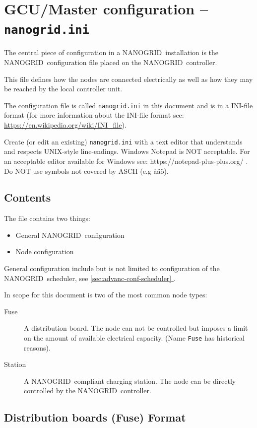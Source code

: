\documentclass[10pt,a4paper,oneside,headings=big,headsepline]{scrreprt}
\newcommand{\nanogrid}{NANOGRID\texttrademark}
\newcommand*{\fullref}[1]{\hyperref[{#1}]{\autoref*{#1} \nameref*{#1}}}
\begin{document}
\section{GCU/Master configuration -- \texttt{nanogrid.ini}}

The central piece of configuration in a \nanogrid\ installation is the
\nanogrid\ configuration file placed on the \nanogrid\  controller.

This file defines how the nodes are connected electrically as well as
how they may be reached by the local controller unit.

The configuration file is called \verb|nanogrid.ini| in this document and is
in a INI-file format (for more information about the INI-file format see:
\url{https://en.wikipedia.org/wiki/INI\_file}).

Create (or edit an existing) \verb|nanogrid.ini| with a text editor that
understands and respects UNIX-style line-endings. Windows Notepad is NOT
acceptable. For an acceptable editor available for Windows see:
https://notepad-plus-plus.org/ . Do NOT use symbols not covered by ASCII (e.g
åäö).

\subsection{Contents}

The file contains two things:

\begin{itemize}
\item General \nanogrid\ configuration
\item Node configuration
\end{itemize}

General configuration include but is not limited to configuration of the
\nanogrid\ scheduler, see \fullref{sec:advanc-conf-scheduler}.

In scope for this document is two of the most common node types:

\begin{description}
\item [Fuse] A distribution board. The node can not be controlled but imposes
  a limit on the amount of available electrical capacity. (Name \verb|Fuse|
  has historical reasons).
\item[Station] A \nanogrid\ compliant charging station. The node can be directly
  controlled by the \nanogrid\ controller.
\end{description}

\subsection{Distribution boards (Fuse) Format}
\end{document}
